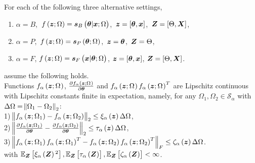 \begin{assumption}\label{assume:lip_cont}
%
For each of the following three alternative settings, 
\begin{enumerate}[label=\text{\ref{assume:lip_cont}}.\arabic*,labelsep=*, leftmargin=*]
    \item $\alpha=B$, $\, f\left(\bm{z};\Omega\right)=\bm{s}_{B}\left(\bm{\theta}|\bm{x};\Omega\right)$, $\, \bm{z}=[\bm{\theta},\bm{x}]$, %
    $\, \randomvec{Z}=[\pr,\X]$, \label{assume:lip_cont_post}
    
    \item  $\alpha=P$, $\, f\left(\bm{z};\Omega\right)=\bm{s}_{P}\left(\bm{\theta};\Omega\right)$, $\, \bm{z}=\bm{\theta}$, %
    $\, \randomvec{Z}=\pr$, \label{assume:lip_cont_prior}
    
    \item  $\alpha=F$, $f\left(\bm{z};\Omega\right)=\bm{s}_{F}\left(\bm{x}|\bm{\theta};\Omega\right)$, $\bm{z}=[\bm{\theta},\bm{x}]$, %
    $\randomvec{Z}=[\pr,\X]$.\label{assume:lip_cont_fisher}
    
\end{enumerate}

assume the following holds.\\
Functions $f_{\alpha}\left(\bm{z};\Omega_{}\right)$, $\frac{\partial f_{\alpha}\left(\bm{z};\Omega_{}\right)}{\partial\bm{\theta}}$ and $f_{\alpha}\left(\bm{z};\Omega_{}\right)f_{\alpha}\left(\bm{z};\Omega_{}\right)^T$ are Lipschitz continuous {with Lipschitz constants finite in expectation,} 
namely, for any {$\Omega_{1}, \Omega_{2} \in \mathcal{S}_{\alpha}$ {with $\Delta\Omega=\norm{\Omega_{1}-\Omega_{2}}_2$}:} \\
   1) 
  $\norm{f_{\alpha}\left(\bm{z};\Omega_{1}\right)-f_{\alpha}\left(\bm{z};\Omega_{2}\right)}_2\leq \xi_{\alpha}\left(\bm{z}\right)\Delta\Omega$,\\
    2) $\norm{\frac{\partial f_{\alpha}\left(\bm{z};\Omega_{1}\right)}{\partial\bm{\theta}}-\frac{\partial f_{\alpha}\left(\bm{z};\Omega_{2}\right)}{\partial\bm{\theta}}}_2\leq \tau_{\alpha}\left(\bm{z}\right)\Delta\Omega$,\\
    3) $\norm{f_{\alpha}\left(\bm{z};\Omega_{1}\right)f_{\alpha}\left(\bm{z};\Omega_{1}\right)^T-f_{\alpha}\left(\bm{z};\Omega_{2}\right)f_{\alpha}\left(\bm{z};\Omega_{2}\right)^T}_F\leq \zeta_{\alpha}\left(\bm{z}\right)\Delta\Omega$.\\
{with} $\expectation{\xi_\alpha\brackets{\randomvec{Z}}{^2}}{\randomvec{Z}},
\expectation{\tau_\alpha\brackets{\randomvec{Z}}}{\randomvec{Z}},
\expectation{ \zeta_{\alpha}\brackets{\randomvec{Z}}}{\randomvec{Z}}<\infty$. 


\end{assumption}

